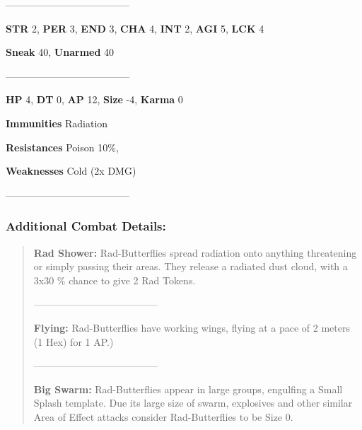 \documentclass[11pt,a4paper,twocolumn]{book}
\begin{document}
	--------------------------------------

\noindent
\textbf{STR} 2, \textbf{PER} 3, \textbf{END} 3, \textbf{CHA} 4, \textbf{INT} 2, \textbf{AGI} 5, \textbf{LCK} 4

\noindent
\textbf{Sneak} 40, \textbf{Unarmed} 40 %

--------------------------------------

\noindent
\textbf{HP} 4, \textbf{DT} 0, \textbf{AP} 12, \textbf{Size} -4, \textbf{Karma} 0


\noindent
\textbf{Immunities} Radiation %

\noindent
\textbf{Resistances} Poison 10\%, %

\noindent
\textbf{Weaknesses}  Cold (2x DMG)%

--------------------------------------	
	
	\subsubsection*{Additional Combat Details:}
	\begin{verse}

		\textbf{Rad Shower:} Rad-Butterflies spread radiation onto anything threatening or simply passing their areas. They release a radiated dust cloud, with a 3x30 \% chance to give 2 Rad Tokens.
		
		--------------------------------------	
		
		\textbf{Flying:} Rad-Butterflies have working wings, flying at a pace of 2 meters (1 Hex) for 1 AP.)
	
--------------------------------------		
	
		\textbf{Big Swarm:} Rad-Butterflies appear in large groups, engulfing a Small Splash template. Due its large size of swarm, explosives and other similar Area of Effect attacks consider Rad-Butterflies to be Size 0.
%		
%		
	\end{verse}
	
\end{document}

